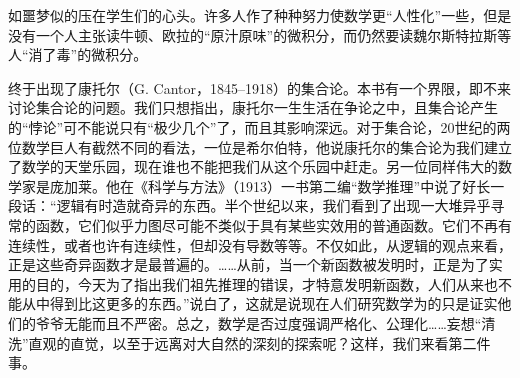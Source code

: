 如噩梦似的压在学生们的心头。许多人作了种种努力使数学更“人性化”一些，但是没有一个人主张读牛顿、欧拉的“原汁原味”的微积分，而仍然要读魏尔斯特拉斯等人“消了毒”的微积分。

终于出现了康托尔（G. Cantor，1845--1918）的集合论。本书有一个界限，即不来讨论集合论的问题。我们只想指出，康托尔一生生活在争论之中，且集合论产生的“悖论”可不能说只有“极少几个”了，而且其影响深远。对于集合论，20世纪的两位数学巨人有截然不同的看法，一位是希尔伯特，他说康托尔的集合论为我们建立了数学的天堂乐园，现在谁也不能把我们从这个乐园中赶走。另一位同样伟大的数学家是庞加莱。他在《科学与方法》（1913）一书第二编“数学推理”中说了好长一段话：“逻辑有时造就奇异的东西。半个世纪以来，我们看到了出现一大堆异乎寻常的函数，它们似乎力图尽可能不类似于具有某些实效用的普通函数。它们不再有连续性，或者也许有连续性，但却没有导数等等。不仅如此，从逻辑的观点来看，正是这些奇异函数才是最普遍的。……从前，当一个新函数被发明时，正是为了实用的目的，今天为了指出我们祖先推理的错误，才特意发明新函数，人们从来也不能从中得到比这更多的东西。”说白了，这就是说现在人们研究数学为的只是证实他们的爷爷无能而且不严密。总之，数学是否过度强调严格化、公理化……妄想“清洗”直观的直觉，以至于远离对大自然的深刻的探索呢？这样，我们来看第二件事。

